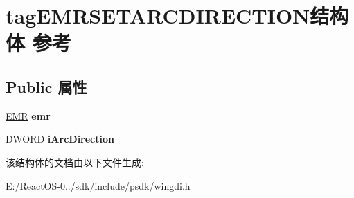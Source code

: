 \hypertarget{structtag_e_m_r_s_e_t_a_r_c_d_i_r_e_c_t_i_o_n}{}\section{tag\+E\+M\+R\+S\+E\+T\+A\+R\+C\+D\+I\+R\+E\+C\+T\+I\+O\+N结构体 参考}
\label{structtag_e_m_r_s_e_t_a_r_c_d_i_r_e_c_t_i_o_n}
\subsection*{Public 属性}
\begin{DoxyCompactItemize}
\item 
\mbox{\label{structtag_e_m_r_s_e_t_a_r_c_d_i_r_e_c_t_i_o_n_a6239d3b4d55e680e2fa7567ab6c657cc}} 
\hyperlink{structtag_e_m_r}{E\+MR} {\bfseries emr}
\item 
\mbox{\label{structtag_e_m_r_s_e_t_a_r_c_d_i_r_e_c_t_i_o_n_aaae9f663552c26a01e31ea8b2ffbe04f}} 
D\+W\+O\+RD {\bfseries i\+Arc\+Direction}
\end{DoxyCompactItemize}


该结构体的文档由以下文件生成\+:\begin{DoxyCompactItemize}
\item 
E\+:/\+React\+O\+S-\/0../sdk/include/psdk/wingdi.\+h\end{DoxyCompactItemize}
